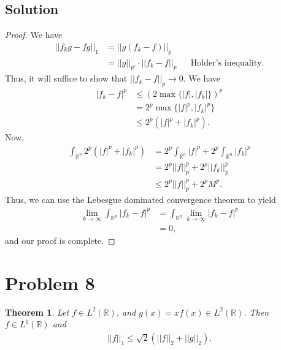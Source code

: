 \documentclass[10pt,a4paper]{article}
\theoremstyle{theorem}
\newtheorem{theorem}{Theorem}
\theoremstyle{definition}
\begin{document}
\subsection*{Solution}
\begin{proof}
We have
\begin{align*}
||f_k g - f g ||_1 &= ||g(f_k - f)||_p\\
&= ||g||_{p'} \cdot ||f_k - f||_p &&\text{Holder's inequality.}
\end{align*}
Thus, it will suffice to show that $||f_k - f||_p \to 0$. We have
\begin{align*}
|f_k - f|^p &\leq (2 \max\{|f|, |f_k|\})^p\\
&= 2^p \max\{|f|^p, |f_k|^p\}\\
&\leq 2^p (|f|^p + |f_k|^p).
\end{align*}
Now, 
\begin{align*}
\int_{\mathbb{R}^n} 2^p (|f|^p + |f_k|^p) &= 2^p \int_{\mathbb{R}^n}|f|^p + 2^p \int_{\mathbb{R}^n}|f_k|^p\\
&= 2^p ||f||_p^p + 2^p ||f_k||_p^p\\
&\leq 2^p ||f||_p^p + 2^p M^p.
\end{align*}
Thus, we can use the Lebesgue dominated convergence theorem to yield
\begin{align*}
\lim_{k \to \infty} \int_{\mathbb{R}^n} |f_k - f|^p &= \int_{\mathbb{R}^n} \lim_{k \to \infty} |f_k - f|^p\\
&= 0,
\end{align*}
and our proof is complete.
\end{proof}

\section*{Problem 8}
\begin{theorem}
Let $f \in L^2 (\mathbb{R})$, and $g(x) = x f(x) \in L^2 (\mathbb{R})$. Then $f \in L^1 (\mathbb{R})$ and 
\begin{align*}
||f||_1 \leq \sqrt{2}(||f||_2 + ||g||_2).
\end{align*}
\end{theorem}
\end{document}
